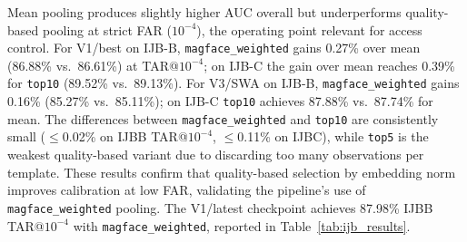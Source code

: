 \begin{table}[h]
\centering
\caption{Template pooling ablation on IJB-B/C. TAR at FAR=$10^{-4}$ is the primary metric for access control. All rows use the same checkpoint per model (V1/best = \texttt{phase1\_best.pt}; V3/SWA = SWA-averaged checkpoint). Bold = best per model group at strict FAR.}
\label{tab:pooling_ablation}
\end{table}

Mean pooling produces slightly higher AUC overall but underperforms quality-based pooling at strict FAR ($10^{-4}$), the operating point relevant for access control. For V1/best on IJB-B, \texttt{magface\_weighted} gains 0.27\% over mean (86.88\% vs.\ 86.61\%) at TAR@$10^{-4}$; on IJB-C the gain over mean reaches 0.39\% for \texttt{top10} (89.52\% vs.\ 89.13\%). For V3/SWA on IJB-B, \texttt{magface\_weighted} gains 0.16\% (85.27\% vs.\ 85.11\%); on IJB-C \texttt{top10} achieves 87.88\% vs.\ 87.74\% for mean. The differences between \texttt{magface\_weighted} and \texttt{top10} are consistently small ($\leq$0.02\% on IJBB TAR@$10^{-4}$, $\leq$0.11\% on IJBC), while \texttt{top5} is the weakest quality-based variant due to discarding too many observations per template. These results confirm that quality-based selection by embedding norm improves calibration at low FAR, validating the pipeline's use of \texttt{magface\_weighted} pooling. The V1/latest checkpoint achieves 87.98\% IJBB TAR@$10^{-4}$ with \texttt{magface\_weighted}, reported in Table~\ref{tab:ijb_results}.

